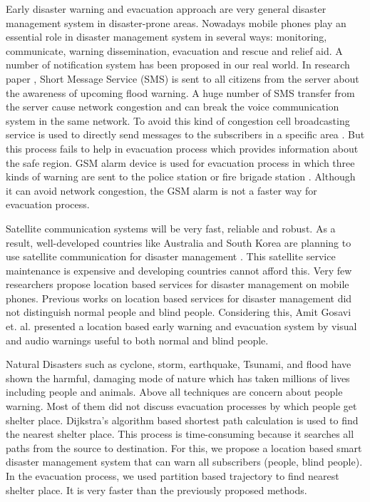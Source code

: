 \documentclass[conference]{IEEEtran}
\begin{document}
Early disaster warning and evacuation approach are very general disaster management system in disaster-prone areas. Nowadays mobile phones play an essential role in disaster management system in several ways: monitoring, communicate, warning dissemination, evacuation and rescue and relief aid. A number of notification system has been proposed in our real world. In research paper \cite{cioca2008sms, jeong2009national}, Short Message Service (SMS) is sent to all citizens from the server about the awareness of upcoming flood warning. A huge number of SMS transfer from the server cause network congestion and can break the voice communication system in the same network. To avoid this kind of congestion cell broadcasting service is used to directly send messages to the subscribers in a specific area \cite {scherner2005notifying}. But this process fails to help in evacuation process which provides information about the safe region. GSM alarm device is used for evacuation process in which three kinds of warning are sent to the police station or fire brigade station \cite{jayasinghe2006gsm}. Although it can avoid network congestion, the GSM alarm is not a faster way for evacuation process.  
 
Satellite communication systems will be very fast, reliable and robust. As a result, well-developed countries like Australia and South Korea are planning to use satellite communication for disaster management \cite{park2006one, aloudat2011toward,jeong2009national}. This satellite service maintenance is expensive and developing countries cannot afford this. Very few researchers propose location based services for disaster management on mobile phones. Previous works on location based services for disaster management did not distinguish normal people and blind people. Considering this, Amit Gosavi et. al. \cite{amit2014} presented a location based early warning and evacuation system by visual and audio warnings useful to both normal and blind people. 

Natural Disasters such as cyclone, storm, earthquake, Tsunami, and flood have shown the harmful, damaging mode of nature which has taken millions of lives including people and animals. Above all techniques are concern about people warning. Most of them did not discuss evacuation processes by which people get shelter place. Dijkstra's algorithm based shortest path calculation is used to find the nearest shelter place\cite{amit2014}. This process is time-consuming because it searches all paths from the source to destination. For this, we propose a location based smart disaster management system that can warn all subscribers (people, blind people). In the evacuation process, we used partition based trajectory to find nearest shelter place. It is very faster than the previously proposed methods.  
\end{document}

